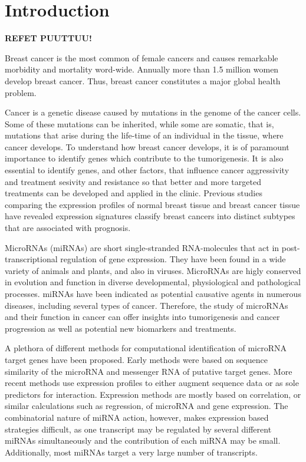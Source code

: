 
\section{Introduction}
\thispagestyle{empty}

\textbf{REFET PUUTTUU!}

Breast cancer is the most common of female cancers and causes remarkable
morbidity and mortality word-wide. Annually more than 1.5 million women
develop breast cancer. Thus, breast cancer constitutes a major global health
problem.

Cancer is a genetic disease caused by mutations in the genome of the cancer
cells. Some of these mutations can be inherited, while some are somatic, that
is, mutations that arise during the life-time of an individual in the tissue,
where cancer develops. To understand how breast cancer develops,
it is of paramount importance to identify genes which
contribute to the tumorigenesis. It is also essential to identify
genes, and other factors, that influence cancer aggressivity and
treatment sesivity and resistance so that better and more targeted
treatments can be developed and applied in the clinic.
Previous studies comparing the expression profiles of normal breast tissue
and breast cancer tissue have revealed expression signatures
classify breast cancers into distinct subtypes that are associated with prognosis.

MicroRNAs (miRNAs) are short single-stranded RNA-molecules that act in
post-transcriptional regulation of gene expression. They have been found in a
wide variety of animals and plants, and also in viruses. MicroRNAs are higly
conserved in evolution and function in diverse developmental, physiological
and pathological processes. miRNAs have been indicated as potential
causative agents in numerous diseases, including several types of cancer.
Therefore, the study of microRNAs and their function in cancer can offer
insights into tumorigenesis and cancer progression as well as potential new
biomarkers and treatments.

A plethora of different methods for computational identification of microRNA
target genes have been proposed. Early methods were based on sequence
similarity of the microRNA and messenger RNA of putative target genes. More
recent methods use expression profiles to either augment sequence data or as
sole predictors for interaction. Expression methods are mostly based on
correlation, or similar calculations such as regression, of microRNA and gene
expression. The combinatorial nature of miRNA action, however, makes
expression based strategies difficult, as one transcript may be regulated by
several different miRNAs simultaneously and the contribution of each miRNA may
be small. Additionally, most miRNAs target a very large number of transcripts.


